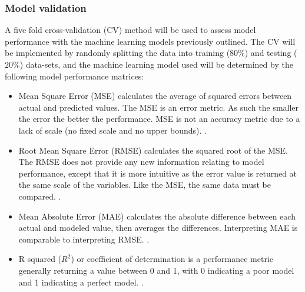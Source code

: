 \subsubsection{Model validation}
A five fold cross-validation (CV) method will be used to assess model performance with the machine learning models previously outlined. The CV will be implemented by randomly splitting the data into training ($80\%$) and testing ($20\%$) data-sets, and the machine learning model used will be determined by the following model performance matrices: 

\begin{itemize}

    \item Mean Square Error (MSE) calculates the average of squared errors between actual and predicted values. The MSE is an error metric. As such the smaller the error the better the performance. MSE is not an accuracy metric due to a lack of scale (no fixed scale and no upper bounds). \citep{Korstanje2021}.
    
    \item Root Mean Square Error (RMSE) calculates the squared root of the MSE. The RMSE does not provide any new information relating to model performance, except that it is more intuitive as the error value is returned at the same scale of the variables. Like the MSE, the same data must be compared. \citep{Korstanje2021}.
    
    \item Mean Absolute Error (MAE) calculates the absolute difference between each actual and modeled value, then averages the differences. Interpreting MAE is comparable to interpreting RMSE. \citep{Korstanje2021}.
    
    \item R squared ($R^{2}$) or coefficient of determination is a performance metric generally returning a value between 0 and 1, with 0 indicating a poor model and 1 indicating a perfect model.
    \citep{Korstanje2021}.
\end{itemize}






